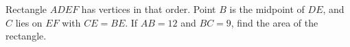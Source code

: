 Rectangle $ADEF$ has vertices in that order. Point $B$ is the midpoint of $DE$, and $C$ lies on $EF$ with $CE=BE$. If $AB=12$ and $BC=9$, find the area of the rectangle.
